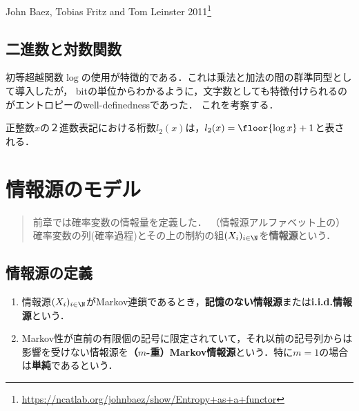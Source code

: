 \documentclass[uplatex,dvipdfmx]{jsreport}
\begin{document}
\begin{tcolorbox}[colframe=ForestGreen, colback=ForestGreen!10!white,breakable,colbacktitle=ForestGreen!40!white,coltitle=black,fonttitle=\bfseries\sffamily,
title=]
    John Baez, Tobias Fritz and Tom Leinster 2011\footnote{\url{https://ncatlab.org/johnbaez/show/Entropy+as+a+functor}}
\end{tcolorbox}

\section{二進数と対数関数}

\begin{tcolorbox}[colframe=ForestGreen, colback=ForestGreen!10!white,breakable,colbacktitle=ForestGreen!40!white,coltitle=black,fonttitle=\bfseries\sffamily,
title=エントロピーの特徴付け]
    初等超越関数$\log$の使用が特徴的である．これは乗法と加法の間の群準同型として導入したが，
    bitの単位からわかるように，文字数としても特徴付けられるのがエントロピーのwell-definednessであった．
    これを考察する．
\end{tcolorbox}

\begin{proposition}
    正整数$x$の２進数表記における桁数$l_2(x)$は，$l_2(x)=\floor{\log x}+1$と表される．
\end{proposition}

\chapter{情報源のモデル}

\begin{quotation}
    前章では確率変数の情報量を定義した．
    （情報源アルファベット上の）確率変数の列(確率過程)とその上の制約の組$(X_i)_{i\in\N}$を\textbf{情報源}という．
\end{quotation}

\section{情報源の定義}

\begin{definition}\mbox{}
    \begin{enumerate}
        \item 情報源$(X_i)_{i\in\N}$がMarkov連鎖であるとき，\textbf{記憶のない情報源}または\textbf{i.i.d.情報源}という．
        \item Markov性が直前の有限個の記号に限定されていて，それ以前の記号列からは影響を受けない情報源を\textbf{（$m$-重）Markov情報源}という．特に$m=1$の場合は\textbf{単純}であるという．
    \end{enumerate}
\end{definition}
\end{document}
